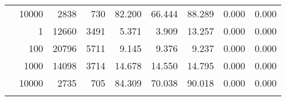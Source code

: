 \begin{table}
\begin{tabular}{rrrrrrrrr}
	            
					 &  
					 
					\multirow{ 1 }{*}{ 10000 } &
					
						
							    
							     2838  & 730  
	                           & 82.200 & 66.444 & 88.289
	                           & 0.000 & 0.000  \\
	                
	            
	        
				\noalign{\smallskip}\hline
				\multirow{ 4 }{*}{ 500000 } &
				
					
					 
					\multirow{ 1 }{*}{ 1 } &
					
						
							    
							     12660  & 3491  
	                           & 5.371 & 3.909 & 13.257
	                           & 0.000 & 0.000  \\
	                
	            
					 &  
					 
					\multirow{ 1 }{*}{ 100 } &
					
						
							    
							     20796  & 5711  
	                           & 9.145 & 9.376 & 9.237
	                           & 0.000 & 0.000  \\
	                
	            
					 &  
					 
					\multirow{ 1 }{*}{ 1000 } &
					
						
							    
							     14098  & 3714  
	                           & 14.678 & 14.550 & 14.795
	                           & 0.000 & 0.000  \\
	                
	            
					 &  
					 
					\multirow{ 1 }{*}{ 10000 } &
					
						
							    
							     2735  & 705  
	                           & 84.309 & 70.038 & 90.018
	                           & 0.000 & 0.000  \\
	                
	            
	        
				\noalign{\smallskip}\hline
				\multirow{ 4 }{*}{ 1000000 } &
				

\end{tabular}
\end{table}
